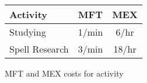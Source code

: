 \begin{SHTable}
	\begin{tabular}{lcc}

	Activity		&	MFT & MEX \\	
\hline
	Studying		  & 1/min & 6/hr \\
	Spell Research	& 3/min & 18/hr \\
    \end{tabular}
    \caption{MFT and MEX costs for activity}
\end{SHTable}
